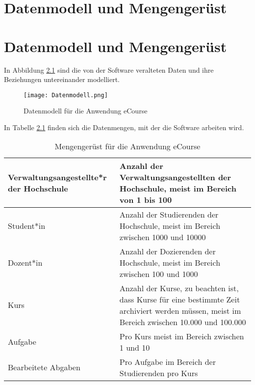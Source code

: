 
\chapter{Datenmodell und Mengengerüst}

\chapter{Datenmodell und Mengengerüst}
In Abbildung \ref{fib:Datenmodell} sind die von der Software veralteten Daten und ihre Beziehungen untereinander modelliert.

\begin{figure}[h]
\centering
\texttt{[image: Datenmodell.png]}
\caption{Datenmodell für die Anwendung eCourse}
\label{fib:Datenmodell}
\end{figure}

In Tabelle \ref{tab:Mengengerüst} finden sich die Datenmengen, mit der die Software arbeiten wird.

\begin{table}
\centering
	\begin{tabularx}{\textwidth}[H]{|X|X|}
		\hline
		Verwaltungsangestellte*r der Hochschule & Anzahl der Verwaltungsangestellten der Hochschule, meist im Bereich von 1 bis 100  \\
		\hline 
		Student*in & Anzahl der Studierenden der Hochschule, meist im Bereich zwischen 1000 und 10000 \\
		\hline
		Dozent*in & Anzahl der Dozierenden der Hochschule, meist im Bereich zwischen 100 und 1000\\
		\hline
		Kurs & Anzahl der Kurse, zu beachten ist, dass Kurse für eine bestimmte Zeit archiviert werden müssen, meist im Bereich zwischen 10.000 und 100.000 \\
		\hline
		Aufgabe & Pro Kurs meist im Bereich zwischen 1 und 10 \\
		\hline
		Bearbeitete Abgaben & Pro Aufgabe im Bereich der Studierenden pro Kurs \\
		\hline
	\end{tabularx}
\caption{Mengengerüst für die Anwendung eCourse}
\label{tab:Mengengerüst}
\end{table}